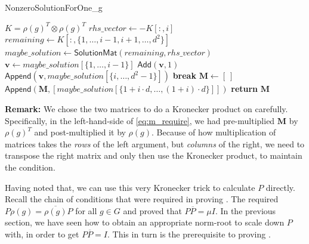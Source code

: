 \documentclass[11pt]{article}
\begin{document}
\begin{algorithm}
  \caption{NonzeroSolutionForOne\_g}
  \label{alg:nonzero}
  \begin{algorithmic}
    \State $K = \rho(g)^T \otimes \rho(g)^T$ 
      \State $rhs\_vector \gets -K[:,i]$ 
      \State $remaining \gets K[:,\{1, \ldots, i-1, i+1, \ldots, d^2\}]$ 
      \State $maybe\_solution \gets \textsf{SolutionMat}(remaining, rhs\_vector)$
       
        \State $\mathbf{v} \gets maybe\_solution[\{1, \ldots, i-1\}]$
        \State $\textsf{Add}(\mathbf{v}, 1)$ 
        \State $\textsf{Append}(\mathbf{v},maybe\_solution[\{i, \ldots, d^2-1\}])$
        \State \textbf{break}
      \EndIf
    \EndFor
    \State $\mathbf{M} \gets [~]$ 
      \State $\textsf{Append}(\mathbf{M}, [maybe\_solution[\{1+i\cdot d, \ldots, (1+i)\cdot d\}]])$
    \EndFor
    \State \textbf{return} $\mathbf{M}$
  \end{algorithmic}
\end{algorithm}

\textbf{Remark:} We chose the two matrices to do a Kronecker product on carefully. Specifically,
in the left-hand-side of \cref{eq:m_require}, we had pre-multiplied $\mathbf{M}$ by $\rho(g)^T$
and post-multiplied it by $\rho(g)$. Because of how multiplication of matrices takes the \textit{rows}
of the left argument, but \textit{columns} of the right, we need to transpose the right matrix
and only then use the Kronecker product, to maintain the condition.

Having noted that, we can use this very Kronecker trick to calculate $P$ directly. Recall the chain
of conditions that were required in proving \cite[Lemma 3.2, 3.3]{Pas21}. The \cite[Lemma 3.2]{Pas21}
required $P\rho(g) = \overline{\rho(g)}P$ for all $g\in G$ and proved that
$P\overline{P} = \mu I$. In the previous section, we have seen how to obtain an
appropriate norm-root to scale down $P$ with, in order to get $P\overline{P} = I$.
This in turn is the prerequisite to proving \cite[Lemma 3.3]{Pas21}.
\end{document}
